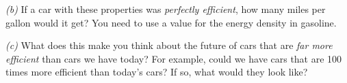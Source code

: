 \documentclass[12pt]{article}
\begin{document}
\textsl{(b)} If a car with these properties was \emph{perfectly
  efficient}, how many miles per gallon would it get? You need to use a value for
the energy density in gasoline.

\textsl{(c)} What does this
make you think about the future of cars that are \emph{far more
  efficient} than cars we have today? For example, could we have cars
that are 100 times more efficient than today's cars? If so, what
would they look like?
\end{document}
